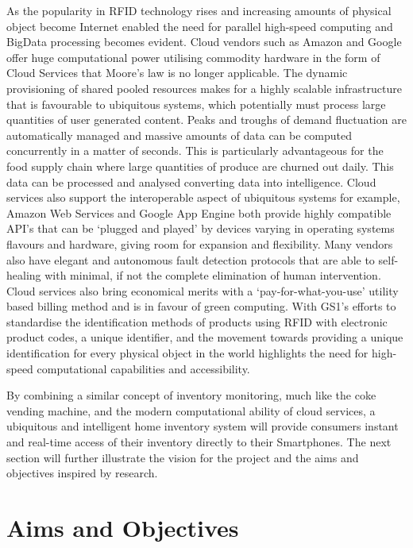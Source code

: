 \documentclass[a4paper, 11pt]{article}
\begin{document}
As the popularity in RFID technology rises and increasing amounts of physical object become Internet enabled the need for parallel high-speed computing and BigData processing becomes evident. Cloud vendors such as Amazon and Google offer huge computational power utilising commodity hardware in the form of Cloud Services that Moore's law is no longer applicable\cite{HadoopInAction}. The dynamic provisioning of shared pooled resources makes for a highly scalable infrastructure that is favourable to ubiquitous systems, which potentially must process large quantities of user generated content. Peaks and troughs of demand fluctuation are automatically managed and massive amounts of data can be computed concurrently in a matter of seconds. This is particularly advantageous for the food supply chain where large quantities of produce are churned out daily. This data can be processed and analysed converting data into intelligence. Cloud services also support the interoperable aspect of ubiquitous systems for example, Amazon Web Services and Google App Engine both provide highly compatible API's that can be `plugged and played' by devices varying in operating systems flavours and hardware, giving room for expansion and flexibility. Many vendors also have elegant and autonomous fault detection protocols that are able to self-healing with minimal, if not the complete elimination of human intervention. Cloud services also bring economical merits with a `pay-for-what-you-use' utility based billing method and is in favour of green computing.\cite{CAYS} With GS1's efforts to standardise the identification methods of products using RFID with electronic product codes, a unique identifier, and the movement towards providing a unique identification for every physical object in the world highlights the need for high-speed computational capabilities and accessibility.\cite{GS1} 

By combining a similar concept of inventory monitoring, much like the coke vending machine, and the modern computational ability of cloud services, a ubiquitous and intelligent home inventory system will provide consumers instant and real-time access of their inventory directly to their Smartphones. The next section will further illustrate the vision for the project and the aims and objectives inspired by research.


\clearpage

\section{Aims and Objectives}
\end{document}
